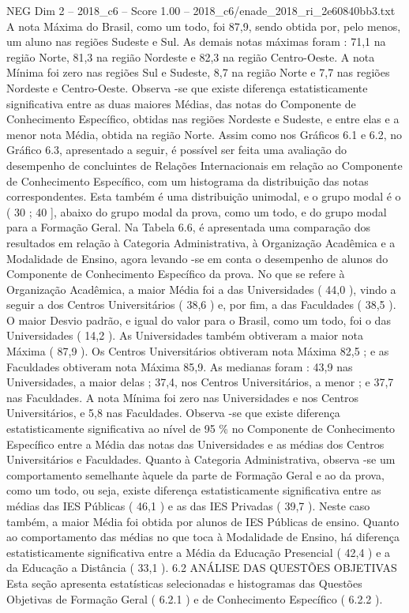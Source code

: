 \begin{textsample}{NEG Dim 2 – 2018\_c6 – Score 1.00 – 2018\_c6/enade\_2018\_ri\_2e60840bb3.txt}
A nota Máxima do Brasil, como um todo, foi 87,9, sendo obtida por, pelo menos, um aluno nas regiões Sudeste e Sul.
As demais notas máximas foram : 71,1 na região Norte, 81,3 na região Nordeste e 82,3 na região Centro-Oeste.
A nota Mínima foi zero nas regiões Sul e Sudeste, 8,7 na região Norte e 7,7 nas regiões Nordeste e Centro-Oeste.
Observa -se que existe diferença estatisticamente significativa entre as duas maiores Médias, das notas do Componente de Conhecimento Específico, obtidas nas regiões Nordeste e Sudeste, e entre elas e a menor nota Média, obtida na região Norte.
Assim como nos Gráficos 6.1 e 6.2, no Gráfico 6.3, apresentado a seguir, é possível ser feita uma avaliação do desempenho de concluintes de Relações Internacionais em relação ao Componente de Conhecimento Específico, com um histograma da distribuição das notas correspondentes.
Esta também é uma distribuição unimodal, e o grupo modal é o ( 30 ; 40 ], abaixo do grupo modal da prova, como um todo, e do grupo modal para a Formação Geral.
Na Tabela 6.6, é apresentada uma comparação dos resultados em relação à Categoria Administrativa, à Organização Acadêmica e a Modalidade de Ensino, agora levando -se em conta o desempenho de alunos do Componente de Conhecimento Específico da prova.
No que se refere à Organização Acadêmica, a maior Média foi a das Universidades ( 44,0 ), vindo a seguir a dos Centros Universitários ( 38,6 ) e, por fim, a das Faculdades ( 38,5 ).
O maior Desvio padrão, e igual do valor para o Brasil, como um todo, foi o das Universidades ( 14,2 ).
As Universidades também obtiveram a maior nota Máxima ( 87,9 ).
Os Centros Universitários obtiveram nota Máxima 82,5 ; e as Faculdades obtiveram nota Máxima 85,9.
As medianas foram : 43,9 nas Universidades, a maior delas ; 37,4, nos Centros Universitários, a menor ; e 37,7 nas Faculdades.
A nota Mínima foi zero nas Universidades e nos Centros Universitários, e 5,8 nas Faculdades.
Observa -se que existe diferença estatisticamente significativa ao nível de 95 \% no Componente de Conhecimento Específico entre a Média das notas das Universidades e as médias dos Centros Universitários e Faculdades.
Quanto à Categoria Administrativa, observa -se um comportamento semelhante àquele da parte de Formação Geral e ao da prova, como um todo, ou seja, existe diferença estatisticamente significativa entre as médias das IES Públicas ( 46,1 ) e as das IES Privadas ( 39,7 ).
Neste caso também, a maior Média foi obtida por alunos de IES Públicas de ensino.
Quanto ao comportamento das médias no que toca à Modalidade de Ensino, há diferença estatisticamente significativa entre a Média da Educação Presencial ( 42,4 ) e a da Educação a Distância ( 33,1 ). 6.2 ANÁLISE DAS QUESTÕES OBJETIVAS Esta seção apresenta estatísticas selecionadas e histogramas das Questões Objetivas de Formação Geral ( 6.2.1 ) e de Conhecimento Específico ( 6.2.2 ).

\end{textsample}
